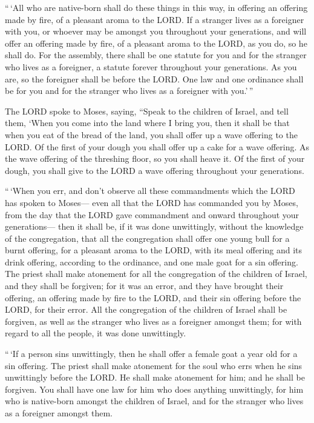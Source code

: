  ``\,`All who are native-born shall do these things in this
way, in offering an offering made by fire, of a pleasant aroma to the
LORD.  If a stranger lives as a foreigner with you, or
whoever may be amongst you throughout your generations, and will offer
an offering made by fire, of a pleasant aroma to the LORD, as you do, so
he shall do.  For the assembly, there shall be one statute
for you and for the stranger who lives as a foreigner, a statute forever
throughout your generations. As you are, so the foreigner shall be
before the LORD.  One law and one ordinance shall be for
you and for the stranger who lives as a foreigner with you.'\,''

 The LORD spoke to Moses, saying,  ``Speak to
the children of Israel, and tell them, `When you come into the land
where I bring you,  then it shall be that when you eat of
the bread of the land, you shall offer up a wave offering to the LORD.
 Of the first of your dough you shall offer up a cake for a
wave offering. As the wave offering of the threshing floor, so you shall
heave it.  Of the first of your dough, you shall give to
the LORD a wave offering throughout your generations.

 ``\,`When you err, and don't observe all these
commandments which the LORD has spoken to Moses---  even
all that the LORD has commanded you by Moses, from the day that the LORD
gave commandment and onward throughout your generations--- 
then it shall be, if it was done unwittingly, without the knowledge of
the congregation, that all the congregation shall offer one young bull
for a burnt offering, for a pleasant aroma to the LORD, with its meal
offering and its drink offering, according to the ordinance, and one
male goat for a sin offering.  The priest shall make
atonement for all the congregation of the children of Israel, and they
shall be forgiven; for it was an error, and they have brought their
offering, an offering made by fire to the LORD, and their sin offering
before the LORD, for their error.  All the congregation of
the children of Israel shall be forgiven, as well as the stranger who
lives as a foreigner amongst them; for with regard to all the people, it
was done unwittingly.

 ``\,`If a person sins unwittingly, then he shall offer a
female goat a year old for a sin offering.  The priest
shall make atonement for the soul who errs when he sins unwittingly
before the LORD. He shall make atonement for him; and he shall be
forgiven.  You shall have one law for him who does anything
unwittingly, for him who is native-born amongst the children of Israel,
and for the stranger who lives as a foreigner amongst them.

